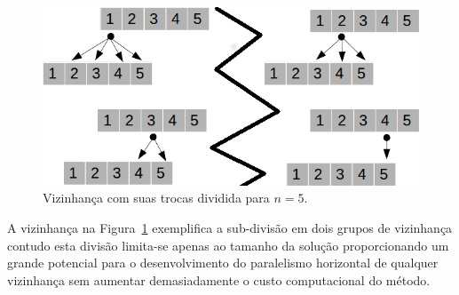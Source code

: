 \begin{figure}[htbp]
    \centerline{\includegraphics[scale=0.6]{figuras/vizinhancaDividida.png}}
    \caption{Vizinhança com suas trocas dividida para $n=5$.}
    \label{fig:vizinhancaTrocasDividida}
\end{figure}

A vizinhança na Figura~\ref{fig:vizinhancaTrocasDividida} exemplifica a sub-divisão em dois grupos de vizinhança contudo esta divisão limita-se apenas ao tamanho da solução proporcionando um grande potencial para o desenvolvimento do paralelismo horizontal de qualquer vizinhança sem aumentar demasiadamente o custo computacional do método.
